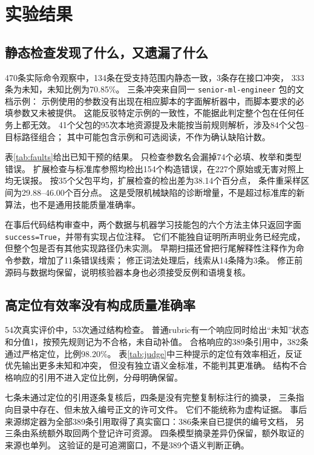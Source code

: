 \section{实验结果}
\subsection{静态检查发现了什么，又遗漏了什么}
470条实际命令观察中，134条在受支持范围内静态一致，3条存在接口冲突，
333条为未知，未知比例为70.85\%。
三条冲突来自同一 \texttt{senior-ml-engineer} 包的文档示例：
示例使用的参数没有出现在相应脚本的字面解析器中，而脚本要求的必填参数又未被提供。
这能反驳特定示例的一致性，不能据此判定整个包在任何任务上都无效。
41个父包的95次本地资源提及未能按当前规则解析，涉及84个父包--目标路径组合；
其中可能包含示例和可选阅读，不作为确认缺陷计数。


表\ref{tab:faults}给出已知干预的结果。
只检查参数名会漏掉74个必填、枚举和类型错误。
扩展检查与标准库参照均检出154个构造错误，在227个原始或无害对照上均无误报。
按35个父包平均，扩展检查的检出差为38.14个百分点，
条件重采样区间为29.88--46.00个百分点。
这是受限机械缺陷的诊断增量，不是超过标准库的新算法，也不是通用技能质量准确率。

在事后代码结构审查中，两个数据与机器学习技能包的六个方法主体只返回字面
\texttt{success=True}，并带有实现占位注释。
它们不能独自证明所声明业务已经完成，但整个包是否有其他实现路径仍未实测。
早期扫描还曾把行尾解释性注释作为命令参数，增加了11条错误线索；
修正词法处理后，线索从14条降为3条。
修正前源码与数据均保留，说明核验器本身也必须接受反例和语境复核。

\subsection{高定位有效率没有构成质量准确率}

54次真实评价中，53次通过结构检查。
普通rubric有一个响应同时给出“未知”状态和分值1，按预先规则记为不合格，未自动补值。
合格响应的389条引用中，382条通过严格定位，比例98.20\%。
表\ref{tab:judge}中三种提示的定位有效率相近，反证优先输出更多未知和冲突，
但没有独立语义金标准，不能判其更准确。
结构不合格响应的引用不进入定位比例，分母明确保留。

七条未通过定位的引用逐条复核后，四条是没有完整复制标注行的摘录，
三条指向目录中存在、但未放入编号正文的许可文件。
它们不能统称为虚构证据。
事后来源绑定器为全部389条引用取得了真实窗口：386条来自已提供的编号文档，
另三条由系统额外取回两个登记许可资源。
四条模型摘录差异仍保留，额外取证的来源也单列。
这验证的是可追溯窗口，不是389个语义判断正确。

